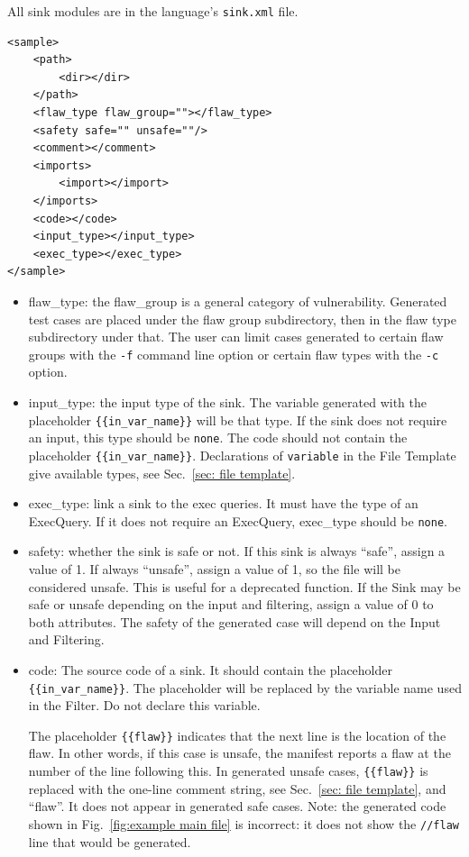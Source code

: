 \documentclass[12pt]{article}
\begin{document}
All sink modules are in the language's \verb|sink.xml| file.

\begin{verbatim}
<sample>
    <path>
	    <dir></dir>
    </path>
    <flaw_type flaw_group=""></flaw_type>
    <safety safe="" unsafe=""/>
    <comment></comment>
    <imports>
        <import></import>
    </imports>
    <code></code>
    <input_type></input_type>
    <exec_type></exec_type>
</sample>
\end{verbatim}

\begin{itemize}
    \item flaw\_type: the flaw\_group is a general category of vulnerability.
    Generated test cases are placed under the flaw group subdirectory, then
    in the flaw type subdirectory under that. The user can limit
    cases generated to certain flaw groups with the \verb|-f| command
    line option or certain flaw types with the \verb|-c| option.
    
    \item input\_type: the input type of the sink. The variable
    generated with the placeholder \verb|{{in_var_name}}| will be 
    that type.  If the sink does not
    require an input, this type should be \verb|none|. The code 
    should not contain
    the placeholder \verb|{{in_var_name}}|.
    Declarations of \verb|variable| in the File Template give
    available types, see Sec.~\ref{sec: file template}.

    \item exec\_type: link a sink to the exec queries.  It must have 
    the type of
    an ExecQuery. If it does not require an ExecQuery, 
    exec\_type should be \verb|none|.

    \item safety: whether the sink is safe or not. If this sink is always
    ``safe'', assign a value of 1.  If always ``unsafe'', assign a value 
    of 1, so the file will be considered unsafe.  
    This is useful for a deprecated function.  If the Sink may be safe or 
    unsafe depending on the input and filtering, assign a value of 0 to 
    both attributes.  The safety of the generated case will depend on
    the Input and Filtering.
    
    \item code: The source code of a sink. It should contain the placeholder
    \verb|{{in_var_name}}|.  The placeholder will be replaced by the variable
    name used in the Filter.  Do not declare this variable.

    The placeholder \verb|{{flaw}}| indicates that the next line is the location
    of the flaw.  In other words, if this case is unsafe, the manifest reports a
    flaw at the number of the line following this.  In generated unsafe cases,
    \verb|{{flaw}}| is replaced with the one-line comment string,
    see Sec.~\ref{sec: file template}, and ``flaw''.
    It does not appear in generated safe cases.
    Note: the generated code shown in Fig.~\ref{fig:example main file} is incorrect:
    it does not show the \verb|//flaw| line that would be generated.
\end{itemize}
\end{document}
